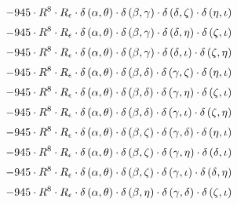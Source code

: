 \begin{subequations}
\begin{gather}
 \\[0.2em] \notag 		 - 945 \cdot R^{8} \cdot R_{\epsilon{}} \cdot \delta{}\left(\alpha{}, \theta{}\right) \cdot \delta{}\left(\beta{}, \gamma{}\right) \cdot \delta{}\left(\delta{}, \zeta{}\right) \cdot \delta{}\left(\eta{}, \iota{}\right) 
 \\[0.2em] \notag 		 - 945 \cdot R^{8} \cdot R_{\epsilon{}} \cdot \delta{}\left(\alpha{}, \theta{}\right) \cdot \delta{}\left(\beta{}, \gamma{}\right) \cdot \delta{}\left(\delta{}, \eta{}\right) \cdot \delta{}\left(\zeta{}, \iota{}\right) 
 \\[0.2em] \notag 		 - 945 \cdot R^{8} \cdot R_{\epsilon{}} \cdot \delta{}\left(\alpha{}, \theta{}\right) \cdot \delta{}\left(\beta{}, \gamma{}\right) \cdot \delta{}\left(\delta{}, \iota{}\right) \cdot \delta{}\left(\zeta{}, \eta{}\right) 
 \\[0.2em] \notag 		 - 945 \cdot R^{8} \cdot R_{\epsilon{}} \cdot \delta{}\left(\alpha{}, \theta{}\right) \cdot \delta{}\left(\beta{}, \delta{}\right) \cdot \delta{}\left(\gamma{}, \zeta{}\right) \cdot \delta{}\left(\eta{}, \iota{}\right) 
 \\[0.2em] \notag 		 - 945 \cdot R^{8} \cdot R_{\epsilon{}} \cdot \delta{}\left(\alpha{}, \theta{}\right) \cdot \delta{}\left(\beta{}, \delta{}\right) \cdot \delta{}\left(\gamma{}, \eta{}\right) \cdot \delta{}\left(\zeta{}, \iota{}\right) 
 \\[0.2em] \notag 		 - 945 \cdot R^{8} \cdot R_{\epsilon{}} \cdot \delta{}\left(\alpha{}, \theta{}\right) \cdot \delta{}\left(\beta{}, \delta{}\right) \cdot \delta{}\left(\gamma{}, \iota{}\right) \cdot \delta{}\left(\zeta{}, \eta{}\right) 
 \\[0.2em] \notag 		 - 945 \cdot R^{8} \cdot R_{\epsilon{}} \cdot \delta{}\left(\alpha{}, \theta{}\right) \cdot \delta{}\left(\beta{}, \zeta{}\right) \cdot \delta{}\left(\gamma{}, \delta{}\right) \cdot \delta{}\left(\eta{}, \iota{}\right) 
 \\[0.2em] \notag 		 - 945 \cdot R^{8} \cdot R_{\epsilon{}} \cdot \delta{}\left(\alpha{}, \theta{}\right) \cdot \delta{}\left(\beta{}, \zeta{}\right) \cdot \delta{}\left(\gamma{}, \eta{}\right) \cdot \delta{}\left(\delta{}, \iota{}\right) 
 \\[0.2em] \notag 		 - 945 \cdot R^{8} \cdot R_{\epsilon{}} \cdot \delta{}\left(\alpha{}, \theta{}\right) \cdot \delta{}\left(\beta{}, \zeta{}\right) \cdot \delta{}\left(\gamma{}, \iota{}\right) \cdot \delta{}\left(\delta{}, \eta{}\right) 
 \\[0.2em] \notag 		 - 945 \cdot R^{8} \cdot R_{\epsilon{}} \cdot \delta{}\left(\alpha{}, \theta{}\right) \cdot \delta{}\left(\beta{}, \eta{}\right) \cdot \delta{}\left(\gamma{}, \delta{}\right) \cdot \delta{}\left(\zeta{}, \iota{}\right) 

\end{gather}
\end{subequations}
